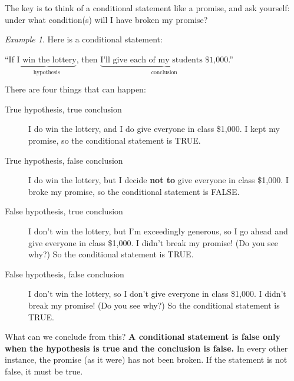 \documentclass[10pt, reqno]{amsart}
\theoremstyle{remark}
\newtheorem{example}[thm]{Example}
\theoremstyle{definition}
\numberwithin{equation}{section}  %
\begin{document}
The key is to think of a conditional statement like a promise, and ask yourself: under what condition(s) will I have broken my promise?

\begin{example}
Here is a conditional statement:
\begin{center}
``If $\underbrace{\text{I win the lottery}}_{\text{hypothesis}}$, then $\underbrace{\text{I'll give  each of my students \$1,000}}_{\text{conclusion}}$.''
\end{center}

There are four things that can happen:
\begin{description}
\item[True hypothesis, true conclusion] I do win the lottery, and I do give everyone in class \$1,000.   I kept my promise, so the conditional statement is TRUE.
\item[True hypothesis, false conclusion] I do win the lottery, but I decide {\bf not to} give everyone in class \$1,000.   I broke my promise, so the conditional statement is FALSE.
\item[False hypothesis, true conclusion] I don't win the lottery, but I'm exceedingly generous, so I go ahead and give everyone in class \$1,000.  I didn't break my promise!  (Do you see why?)  So the conditional statement is TRUE.
\item[False hypothesis, false conclusion] I don't win the lottery,  so I don't give everyone in class \$1,000.  I didn't break my promise!  (Do you see why?)  So the conditional statement is TRUE.
\end{description}
\end{example}

What can we conclude from this?  {\bf A conditional statement is false only when the hypothesis is true and the conclusion is false.}  In every other instance, the promise (as it were) has not been broken.  If the statement is not false, it must be true.
\end{document}
